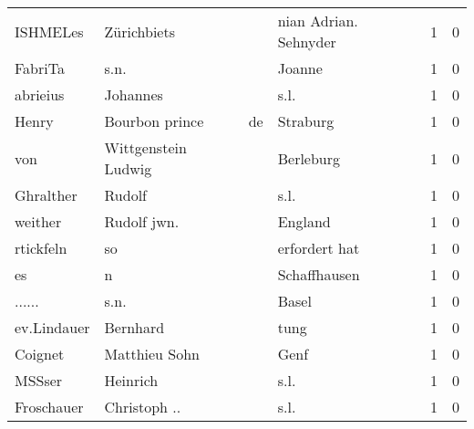 \begin{center}
\begin{tiny}
\begin{longtabu}{llllrr}
                 ISHMELes &                        Zürichbiets &             &                       nian Adrian. Sehnyder &          1 &         0 \\
                  FabriTa &                               s.n. &             &                                      Joanne &          1 &         0 \\
                 abrieius &                           Johannes &             &                                        s.l. &          1 &         0 \\
                    Henry &                     Bourbon prince &          de &                                    Straburg &          1 &         0 \\
                      von &                Wittgenstein Ludwig &             &                                   Berleburg &          1 &         0 \\
                Ghralther &                             Rudolf &             &                                        s.l. &          1 &         0 \\
                  weither &                        Rudolf jwn. &             &                                     England &          1 &         0 \\
                rtickfeln &                                 so &             &                               erfordert hat &          1 &         0 \\
                       es &                                  n &             &                                Schaffhausen &          1 &         0 \\
                   ...... &                               s.n. &             &                                       Basel &          1 &         0 \\
              ev.Lindauer &                           Bernhard &             &                                        tung &          1 &         0 \\
                  Coignet &                      Matthieu Sohn &             &                                        Genf &          1 &         0 \\
                   MSSser &                           Heinrich &             &                                        s.l. &          1 &         0 \\
               Froschauer &                       Christoph .. &             &                                        s.l. &          1 &         0 \\

\end{longtabu}
\end{tiny}
\end{center}
